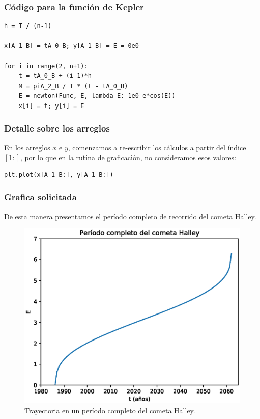 \begin{frame}
    \frametitle{Código para la función de Kepler}
\begin{lstlisting}[caption=Código para graficar $E(t)$, style=codigopython]
h = T / (n-1)

x[A_1_B] = tA_0_B; y[A_1_B] = E = 0e0

for i in range(2, n+1):
    t = tA_0_B + (i-1)*h
    M = piA_2_B / T * (t - tA_0_B)
    E = newton(Func, E, lambda E: 1e0-e*cos(E))
    x[i] = t; y[i] = E
\end{lstlisting}
\end{frame}
\begin{frame}[fragile]
\frametitle{Detalle sobre los arreglos}
En los arreglos $x$ e $y$, comenzamos a re-escribir los cálculos a partir del índice $[1:]$, por lo que en la rutina de graficación, no consideramos esos valores:
\begin{lstlisting}[caption=Haciendo slicing para la gráfica, style=codigopython]
plt.plot(x[A_1_B:], y[A_1_B:])
\end{lstlisting}
\end{frame}
\begin{frame}
\frametitle{Grafica solicitada}
De esta manera presentamos el período completo de recorrido del cometa Halley.
\begin{figure}[h!]
    \centering
    \includegraphics[scale=0.5]{Imagenes/raices_scipy_aplicacion_03.eps}
    \caption{Trayectoria en un período completo del cometa Halley.}
\end{figure}
\end{frame}
